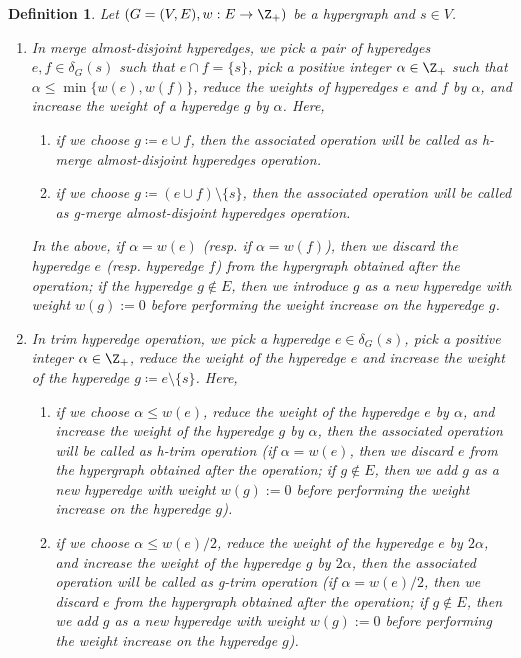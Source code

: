 \documentclass{article}
\newtheorem{definition}{Definition}[section]
\begin{document}
\begin{definition}\label{defn:splitting-off}
    Let $(G=(V, E), w: E\rightarrow \Z_+)$ be a hypergraph and $s\in V$. 
    \begin{enumerate}
            
        \item 
        In \emph{merge almost-disjoint hyperedges}, we pick a pair of hyperedges $e, f\in \delta_G(s)$ such that $e\cap f=\{s\}$, pick a positive integer $\alpha \in \Z_+$ such that $\alpha\le \min\{w(e), w(f)\}$, reduce the weights of hyperedges $e$ and $f$ by $\alpha$, and increase the weight of a hyperedge $g$ by $\alpha$. Here, 
        \begin{enumerate}
            \item if we choose $g\coloneqq e \cup f$, then the associated operation will be called as \emph{h-merge almost-disjoint hyperedges operation}.
            \item if we choose $g\coloneqq (e\cup f)\setminus \{s\}$, then the associated operation will be called as \emph{g-merge almost-disjoint hyperedges operation}.
        \end{enumerate}
        In the above, if $\alpha=w(e)$ (resp. if $\alpha = w(f)$), then we discard the hyperedge $e$ (resp. hyperedge $f$) from the hypergraph obtained after the operation; if the hyperedge $g\not\in E$, then we introduce $g$ as a new hyperedge with weight $w(g) := 0$ before performing the weight increase on the hyperedge $g$.
    
        \item 
        In \emph{trim hyperedge operation}, we pick a hyperedge $e\in \delta_G(s)$, pick a positive integer $\alpha \in \Z_+$,
        reduce the weight of the hyperedge $e$ and 
        increase the weight of the hyperedge $g\coloneqq e\setminus \{s\}$. Here, 
        \begin{enumerate}
            \item if we choose $\alpha \le w(e)$, reduce the weight of the hyperedge $e$ by $\alpha$,  and increase the weight of the hyperedge $g$ by $\alpha$, then the associated operation will be called as \emph{h-trim operation} (if $\alpha=w(e)$, then we discard $e$ from the hypergraph obtained after the operation; if $g\not\in E$, then we add $g$ as a new hyperedge with weight $w(g) := 0$ before performing the weight increase on the hyperedge $g$). 
            
            \item if we choose $\alpha \le w(e)/2$, reduce the weight of the hyperedge $e$ by $2\alpha$, and increase the weight of the hyperedge $g$ by $2\alpha$, then the associated operation will be called as \emph{g-trim operation} (if $\alpha=w(e)/2$, then we discard $e$ from the hypergraph obtained after the operation; if $g\not\in E$, then we add $g$ as a new hyperedge with weight $w(g) := 0$ before performing the weight increase on the hyperedge $g$).  
        \end{enumerate}


\end{enumerate}
\end{definition}
\end{document}
